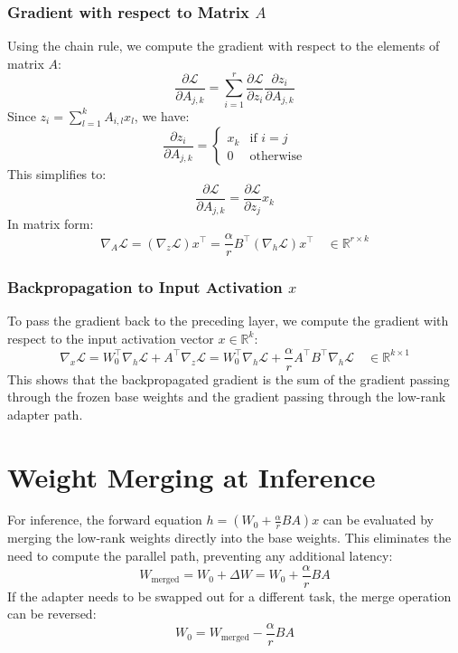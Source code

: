 \documentclass{article}
\begin{document}
\subsubsection{Gradient with respect to Matrix $A$}
Using the chain rule, we compute the gradient with respect to the elements of matrix $A$:
\begin{equation}
  \frac{\partial \mathcal{L}}{\partial A_{j,k}} = \sum_{i=1}^r \frac{\partial \mathcal{L}}{\partial z_i} \frac{\partial z_i}{\partial A_{j,k}}
\end{equation}
Since $z_i = \sum_{l=1}^k A_{i,l} x_l$, we have:
\begin{equation}
  \frac{\partial z_i}{\partial A_{j,k}} = \begin{cases} x_k & \text{if } i = j \\ 0 & \text{otherwise} \end{cases}
\end{equation}
This simplifies to:
\begin{equation}
  \frac{\partial \mathcal{L}}{\partial A_{j,k}} = \frac{\partial \mathcal{L}}{\partial z_j} x_k
\end{equation}
In matrix form:
\begin{equation}
  \nabla_A \mathcal{L} = (\nabla_z \mathcal{L}) x^\top = \frac{\alpha}{r} B^\top (\nabla_h \mathcal{L}) x^\top \quad \in \mathbb{R}^{r \times k}
\end{equation}

\subsubsection{Backpropagation to Input Activation $x$}
To pass the gradient back to the preceding layer, we compute the gradient with respect to the input activation vector $x \in \mathbb{R}^k$:
\begin{equation}
  \nabla_x \mathcal{L} = W_0^\top \nabla_h \mathcal{L} + A^\top \nabla_z \mathcal{L} = W_0^\top \nabla_h \mathcal{L} + \frac{\alpha}{r} A^\top B^\top \nabla_h \mathcal{L} \quad \in \mathbb{R}^{k \times 1}
\end{equation}
This shows that the backpropagated gradient is the sum of the gradient passing through the frozen base weights and the gradient passing through the low-rank adapter path.

\section{Weight Merging at Inference}
For inference, the forward equation $h = (W_0 + \frac{\alpha}{r} BA)x$ can be evaluated by merging the low-rank weights directly into the base weights. This eliminates the need to compute the parallel path, preventing any additional latency:
\begin{equation}
  W_{\text{merged}} = W_0 + \Delta W = W_0 + \frac{\alpha}{r} B A
\end{equation}
If the adapter needs to be swapped out for a different task, the merge operation can be reversed:
\begin{equation}
  W_0 = W_{\text{merged}} - \frac{\alpha}{r} B A
\end{equation}
\end{document}
